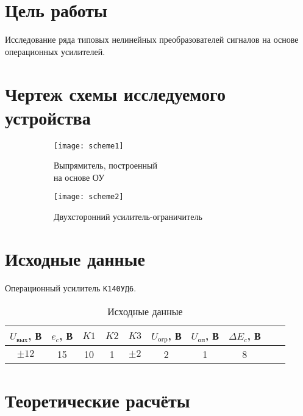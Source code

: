 





\section{Цель работы}

Исследование ряда типовых нелинейных преобразователей сигналов на основе операционных усилителей.

\section{Чертеж схемы исследуемого устройства}

\begin{figure}[H]
\begin{center}
	\begin{subfigure}[b]{0.45\textwidth}
		\texttt{[image: scheme1]}
		\caption{Выпрямитель, построенный \\на основе ОУ}
	\end{subfigure}
	\begin{subfigure}[b]{0.45\textwidth}
		\texttt{[image: scheme2]}
		\caption{Двухсторонний усилитель-ограничитель}
	\end{subfigure}
	\caption{}
\end{center}
\end{figure}


\section{Исходные данные}

Операционный усилитель \verb+К140УД6+.

\begin{table}[H]
\begin{center}
	\caption{Исходные данные}
	\def\tabcolsep{12pt}
	\begin{tabular}{|c|c|c|c|c|c|c|c|c|c|}
		\hline
		$U_\text{вых}$, В &
		$e_c$, В &
		$K1$ &
		$K2$ &
		$K3$ &
		$U_\text{огр}$, В &
		$U_\text{оп}$, В &
		$\Delta E_c$, В \\
		\hline
		$\pm12$ &
		15 &
		10 &
		1 &
		$\pm2$ &
		2 &
		1 &
		8 \\
	    \hline	
	\end{tabular}
\end{center}
\end{table}

\section{Теоретические расчёты}

